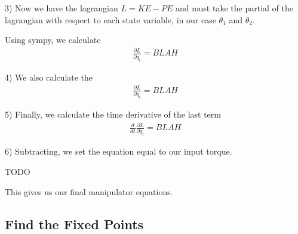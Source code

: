 \documentclass[conference]{IEEEtran}
\begin{document}
3) Now we have the lagrangian $L = KE - PE$ and must take the partial of the lagrangian with
respect to each state variable, in our case $\theta_1$ and $\theta_2$.

Using sympy, we calculate
\begin{align}
    \frac{\partial L}{\partial q_i} =  BLAH
\end{align}

4) We also calculate the
\begin{align}
    \frac{\partial L}{\partial \dot q_i} =  BLAH
\end{align}

5) Finally, we calculate the time derivative of the last term
\begin{align}
    \frac{d}{dt} \frac{\partial L}{\partial \dot q_i} =  BLAH
\end{align}

6) Subtracting, we set the equation equal to our input torque.

TODO %

This gives us our final manipulator equations.






\subsection{Find the Fixed Points}
\end{document}
